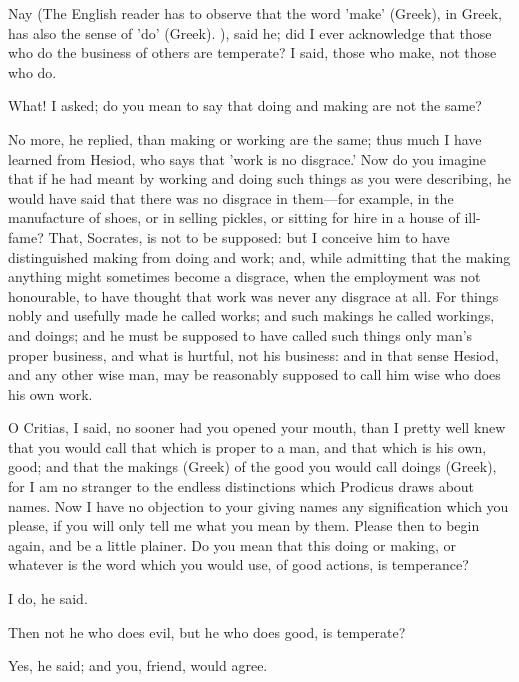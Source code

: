 \documentclass[11pt,letter]{article}
\begin{document}
\par  Nay (The English reader has to observe that the word 'make' (Greek), in Greek, has also the sense of 'do' (Greek). ), said he; did I ever acknowledge that those who do the business of others are temperate? I said, those who make, not those who do.

\par  What! I asked; do you mean to say that doing and making are not the same?

\par  No more, he replied, than making or working are the same; thus much I have learned from Hesiod, who says that 'work is no disgrace.' Now do you imagine that if he had meant by working and doing such things as you were describing, he would have said that there was no disgrace in them—for example, in the manufacture of shoes, or in selling pickles, or sitting for hire in a house of ill-fame? That, Socrates, is not to be supposed: but I conceive him to have distinguished making from doing and work; and, while admitting that the making anything might sometimes become a disgrace, when the employment was not honourable, to have thought that work was never any disgrace at all. For things nobly and usefully made he called works; and such makings he called workings, and doings; and he must be supposed to have called such things only man's proper business, and what is hurtful, not his business: and in that sense Hesiod, and any other wise man, may be reasonably supposed to call him wise who does his own work.

\par  O Critias, I said, no sooner had you opened your mouth, than I pretty well knew that you would call that which is proper to a man, and that which is his own, good; and that the makings (Greek) of the good you would call doings (Greek), for I am no stranger to the endless distinctions which Prodicus draws about names. Now I have no objection to your giving names any signification which you please, if you will only tell me what you mean by them. Please then to begin again, and be a little plainer. Do you mean that this doing or making, or whatever is the word which you would use, of good actions, is temperance?

\par  I do, he said.

\par  Then not he who does evil, but he who does good, is temperate?

\par  Yes, he said; and you, friend, would agree.
\end{document}
